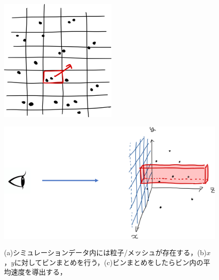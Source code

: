 \begin{figure}
\begin{minipage}[b]{0.2\linewidth}
		\subcaption{}
		\label{}
	\end{minipage}
	\begin{minipage}[b]{0.2\linewidth}
		\centering
		\includegraphics[width=\linewidth]{./pic/outflow_ex4.png}
		\subcaption{}
		\label{}
	\end{minipage}
	\begin{minipage}[b]{\linewidth}
		\centering
		\includegraphics[width=0.55\linewidth]{./pic/outflow_ex5.png}
		\subcaption{}
		\label{}
	\end{minipage}
	
	\caption{(a)シミュレーションデータ内には粒子/メッシュが存在する，(b)$x$，$y$に対してビンまとめを行う，(c)ビンまとめをしたらビン内の平均速度を導出する，}
	\label{}
\end{figure}